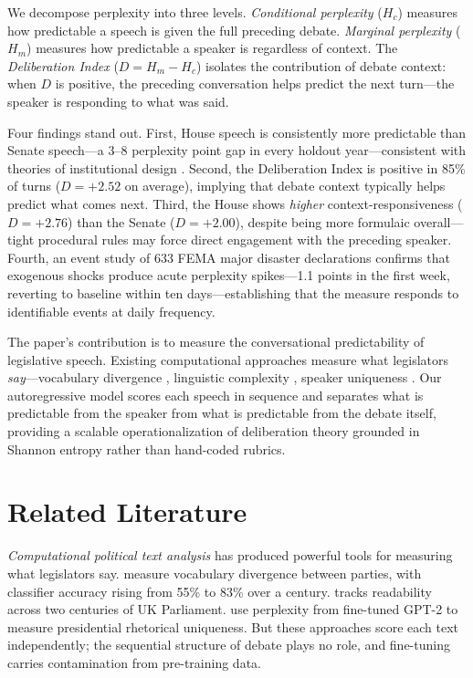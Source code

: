 \documentclass[12pt]{article}
\newcommand{\Hc}{H_c}
\newcommand{\Hm}{H_m}
\newcommand{\DI}{\mathit{D}}
\begin{document}
We decompose perplexity into three levels. \textit{Conditional perplexity} ($\Hc$) measures how predictable a speech is given the full preceding debate. \textit{Marginal perplexity} ($\Hm$) measures how predictable a speaker is regardless of context. The \textit{Deliberation Index} ($\DI = \Hm - \Hc$) isolates the contribution of debate context: when $\DI$ is positive, the preceding conversation helps predict the next turn---the speaker is responding to what was said.

Four findings stand out. First, House speech is consistently more predictable than Senate speech---a 3--8 perplexity point gap in every holdout year---consistent with theories of institutional design \citep{perssonTabellini2000}. Second, the Deliberation Index is positive in 85\% of turns ($\DI = +2.52$ on average), implying that debate context typically helps predict what comes next. Third, the House shows \textit{higher} context-responsiveness ($\DI = +2.76$) than the Senate ($\DI = +2.00$), despite being more formulaic overall---tight procedural rules may force direct engagement with the preceding speaker. Fourth, an event study of 633 FEMA major disaster declarations confirms that exogenous shocks produce acute perplexity spikes---1.1 points in the first week, reverting to baseline within ten days---establishing that the measure responds to identifiable events at daily frequency.

The paper's contribution is to measure the conversational predictability of legislative speech. Existing computational approaches measure what legislators \textit{say}---vocabulary divergence \citep{gentzkow2019}, linguistic complexity \citep{spirling2016}, speaker uniqueness \citep{zhou2024}. Our autoregressive model scores each speech in sequence and separates what is predictable from the speaker from what is predictable from the debate itself, providing a scalable operationalization of deliberation theory \citep{habermas1996, steiner2004} grounded in Shannon entropy rather than hand-coded rubrics.


\section{Related Literature}

\textit{Computational political text analysis} has produced powerful tools for measuring what legislators say. \citet{gentzkow2019} measure vocabulary divergence between parties, with classifier accuracy rising from 55\% to 83\% over a century. \citet{spirling2016} tracks readability across two centuries of UK Parliament. \citet{zhou2024} use perplexity from fine-tuned GPT-2 to measure presidential rhetorical uniqueness. But these approaches score each text independently; the sequential structure of debate plays no role, and fine-tuning carries contamination from pre-training data.
\end{document}

